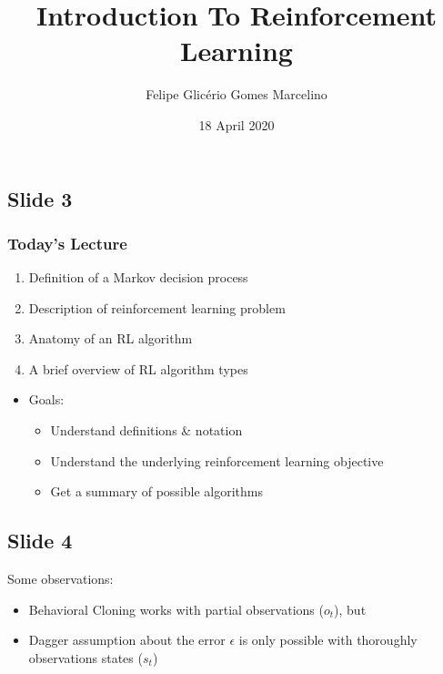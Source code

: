 \documentclass[]{article}
\begin{document}
\title{Introduction To Reinforcement Learning}
\author{Felipe Glicério Gomes Marcelino}
\date{18 April 2020}
\maketitle

\subsection*{Slide 3}%
\label{sub:Slide 3}

\subsubsection*{Today's Lecture}

\begin{enumerate}
    \item Definition of a Markov decision process
    \item Description of reinforcement learning problem
    \item Anatomy of an RL algorithm
    \item A brief overview of RL algorithm types
\end{enumerate}

\begin{itemize}
    \item Goals:
        \begin{itemize}
            \item Understand definitions \& notation
            \item Understand the underlying reinforcement learning objective
            \item Get a summary of possible algorithms
        \end{itemize}
\end{itemize}

\subsection*{Slide 4}%
\label{sub:Slide 4}

Some observations:
\begin{itemize}
    \item Behavioral Cloning works with partial observations ($o_{t}$), but
    \item Dagger assumption about the error  $\epsilon $ is only possible with thoroughly observations states ($s_{t}$)
\end{itemize}
\end{document}
